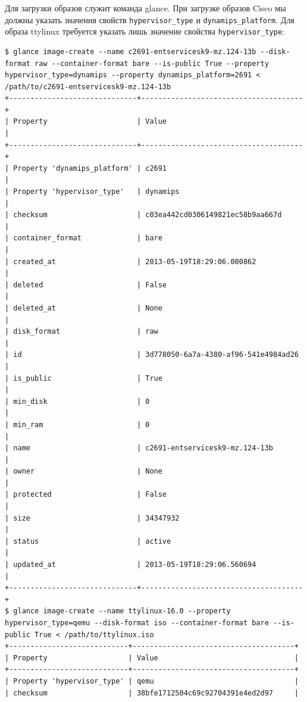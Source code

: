 Для загрузки образов служит команда glance. При загрузке образов Cisco мы должны указать значения свойств 
\verb`hypervisor_type` и \verb`dynamips_platform`. Для образа ttylinux требуется указать лишь значение свойства
\verb`hypervisor_type`:
\begin{lstlisting}
$ glance image-create --name c2691-entservicesk9-mz.124-13b --disk-format raw --container-format bare --is-public True --property hypervisor_type=dynamips --property dynamips_platform=2691 < /path/to/c2691-entservicesk9-mz.124-13b
+------------------------------+--------------------------------------+
| Property                     | Value                                |
+------------------------------+--------------------------------------+
| Property 'dynamips_platform' | c2691                                 |
| Property 'hypervisor_type'   | dynamips                             |
| checksum                     | c03ea442cd0306149821ec58b9aa667d     |
| container_format             | bare                                 |
| created_at                   | 2013-05-19T18:29:06.000862           |
| deleted                      | False                                |
| deleted_at                   | None                                 |
| disk_format                  | raw                                  |
| id                           | 3d778050-6a7a-4380-af96-541e4984ad26 |
| is_public                    | True                                 |
| min_disk                     | 0                                    |
| min_ram                      | 0                                    |
| name                         | c2691-entservicesk9-mz.124-13b       |
| owner                        | None                                 |
| protected                    | False                                |
| size                         | 34347932                             |
| status                       | active                               |
| updated_at                   | 2013-05-19T18:29:06.560694           |
+------------------------------+--------------------------------------+
$ glance image-create --name ttylinux-16.0 --property hypervisor_type=qemu --disk-format iso --container-format bare --is-public True < /path/to/ttylinux.iso
+----------------------------+--------------------------------------+
| Property                   | Value                                |
+----------------------------+--------------------------------------+
| Property 'hypervisor_type' | qemu                                 |
| checksum                   | 38bfe1712504c69c92704391e4ed2d97     |

\end{lstlisting}
